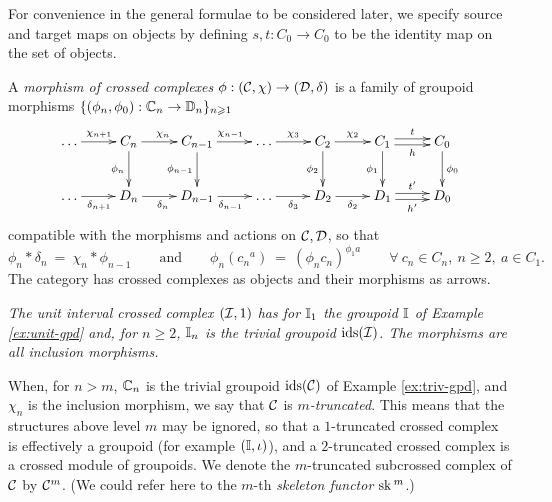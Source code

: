 For convenience in the general formulae to be considered later, 
we specify source and target maps on objects by defining 
$s,t : C_0 \to C_0$ to be the identity map on the set of objects. 

\medskip
A \emph{morphism of crossed complexes} $\phi:(\mathcal{C},\chi) \to (\mathcal{D},\delta)$ 
is a family of groupoid morphisms 
$\{(\phi_n,\phi_0) : \mathbb{C}_n \to \mathbb{D}_n\}_{n \geqslant 1}$ 
\begin{equation} \label{eq:xcomp-mor} 
\xymatrix{ 
  \ldots  \ar[r]^{\chi_{n+1}} 
    &  C_n  \ar[r]^{\chi_n}  \ar[d]_{\phi_n} 
       &  C_{n-1}  \ar[r]^{\chi_{n-1}}  \ar[d]_{\phi_{n-1}}  
          & \ldots \ar[r]^{\chi_3}  
             &  C_2  \ar[r]^{\chi_2} \ar[d]_{\phi_2}
                &  C_1 \ar[r]<+0.5ex>^t \ar[r]<-0.5ex>_h \ar[d]_{\phi_1} 
                   &  C_0  \ar[d]^{\phi_0} \\
  \ldots  \ar[r]_{\delta_{n+1}} 
    &  D_n  \ar[r]_{\delta_n} 
       &  D_{n-1}  \ar[r]_{\delta_{n-1}} 
          & \ldots  \ar[r]_{\delta_3} 
             &  D_2  \ar[r]_{\delta_2} 
                &  D_1 \ar[r]<+0.5ex>^{t'} \ar[r]<-0.5ex>_{h'}  
                   &  D_0   \\
}
\end{equation}
compatible with the morphisms and actions on $\mathcal{C},\mathcal{D}$, so that 
$$
\phi_n*\delta_n ~=~ \chi_n*\phi_{n-1} 
\qquad\text{and}\qquad 
\phi_n({c_n}^a) ~=~ (\phi_n c_n)^{\phi_1 a}
\qquad \forall~ c_n \in C_n,~ n \geqslant 2,~ a \in C_1.
$$
The category \catXComp\; has crossed complexes as objects 
and their morphisms as arrows. 

\begin{example}
\emph{The \emph{unit interval crossed complex} $(\mathcal{I},1)$ 
has for $\mathbb{I}_1$ the groupoid $\mathbb{I}$ of Example \ref{ex:unit-gpd} and, 
for $n \geqslant 2$, $\mathbb{I}_n$ is the trivial groupoid $\mathrm{ids}(\mathcal{I})$. 
The morphisms are all inclusion morphisms. 
}\end{example} 

When, for $n>m$, $\mathbb{C}_n$ is the trivial groupoid $\mathrm{ids}(\mathcal{C})$ 
of Example \ref{ex:triv-gpd}, and $\chi_n$ is the inclusion morphism, 
we say that $\mathcal{C}$ is \emph{$m$-truncated}. 
This means that the structures above level $m$ may be ignored, 
so that a $1$-truncated crossed complex is effectively a groupoid 
(for example $(\mathbb{I},\iota)$), 
and a $2$-truncated crossed complex is a crossed module of groupoids. 
We denote the $m$-truncated subcrossed complex of $\mathcal{C}$ by $\mathcal{C}^m$. 
(We could refer here to the $m$-th \emph{skeleton functor} $\mathrm{sk}\,^m$.) 



